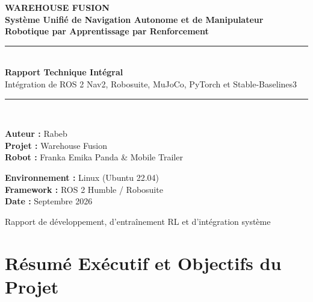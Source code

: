 \documentclass[11pt,a4paper]{article}
\begin{document}
\begin{titlepage}
    \centering
    \vspace*{1cm}
    
    {\Huge \bfseries \color{primaryblue} WAREHOUSE FUSION}\\[0.4cm]
    {\Large \bfseries Système Unifié de Navigation Autonome et de Manipulateur Robotique par Apprentissage par Renforcement}\\[1.5cm]
    
    \rule{\linewidth}{1.5pt}\\[0.8cm]
    {\Large \textbf{Rapport Technique Intégral}}\\[0.3cm]
    {\large Intégration de ROS 2 Nav2, Robosuite, MuJoCo, PyTorch et Stable-Baselines3}\\[0.8cm]
    \rule{\linewidth}{1.5pt}\\[2.5cm]
    
    \begin{minipage}{0.48\textwidth}
        \begin{flushleft} \large
            \textbf{Auteur :} Rabeb\\
            \textbf{Projet :} Warehouse Fusion\\
            \textbf{Robot :} Franka Emika Panda \& Mobile Trailer
        \end{flushleft}
    \end{minipage}
    \begin{minipage}{0.48\textwidth}
        \begin{flushright} \large
            \textbf{Environnement :} Linux (Ubuntu 22.04)\\
            \textbf{Framework :} ROS 2 Humble / Robosuite\\
            \textbf{Date :} Septembre 2026
        \end{flushright}
    \end{minipage}
    
    \vfill
    {\small \color{gray} Rapport de développement, d'entraînement RL et d'intégration système}
\end{titlepage}

\newpage
\tableofcontents
\newpage

\section{Résumé Exécutif et Objectifs du Projet}
\end{document}
